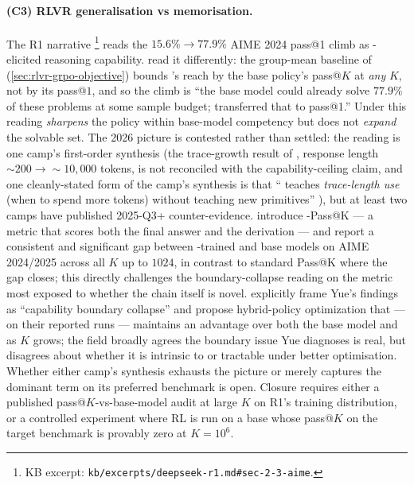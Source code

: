 \paragraph{(C3) RLVR generalisation vs memorisation.}
The R1 narrative \citep[\S 2.3]{deepseek-r1}\footnote{KB excerpt:
\nolinkurl{kb/excerpts/deepseek-r1.md#sec-2-3-aime}.} reads the
$15.6\%\!\to\!77.9\%$ AIME 2024 pass@1 climb as -elicited
reasoning capability. %
read it differently: the
group-mean baseline of  (\cref{sec:rlvr-grpo-objective}) bounds
's reach by the base policy's pass@$K$ at \emph{any} $K$, not by
its pass@$1$, and so the climb is ``the base model could already solve
$77.9\%$ of these problems at some sample budget;  transferred
that to pass@1.'' Under this reading  \emph{sharpens} the policy
within base-model competency but does not \emph{expand} the solvable
set. The 2026 picture is contested rather than settled: the
\citeauthor{rlvr-limits-2025} reading is one camp's first-order
synthesis (the trace-growth result of \citet[\S 2.2]{deepseek-r1},
response length $\sim 200 \to \sim 10{,}000$ tokens, is not reconciled
with the capability-ceiling claim, and one cleanly-stated form of the
camp's synthesis is that `` teaches \emph{trace-length use} (when
to spend more tokens) without teaching new primitives''
\citep[\S 5]{rlvr-limits-2025}), but at least two camps have published
2025-Q3+ counter-evidence.  introduce
-Pass@K --- a metric that scores both the final answer and the
 derivation --- and report a consistent and
significant gap between -trained and base models on
AIME 2024/2025 across all $K$ up to $1024$, in contrast to standard
Pass@K where the gap closes; this directly challenges the
boundary-collapse reading on the metric most exposed to whether the
chain itself is novel.  explicitly frame Yue's
findings as ``capability boundary collapse'' and propose
hybrid-policy optimization that --- on their reported runs ---
maintains an advantage over both the base model and  as $K$ grows;
the field broadly agrees the boundary issue Yue diagnoses is real, but
disagrees about whether it is intrinsic to  or tractable under
better optimisation. Whether either camp's synthesis exhausts the
picture or merely captures the dominant term on its preferred
benchmark is open. Closure requires
either a published pass@$K$-vs-base-model audit at large $K$ on R1's
training distribution, or a controlled experiment where RL is run on a
base whose pass@$K$ on the target benchmark is provably zero at
$K = 10^{6}$.

